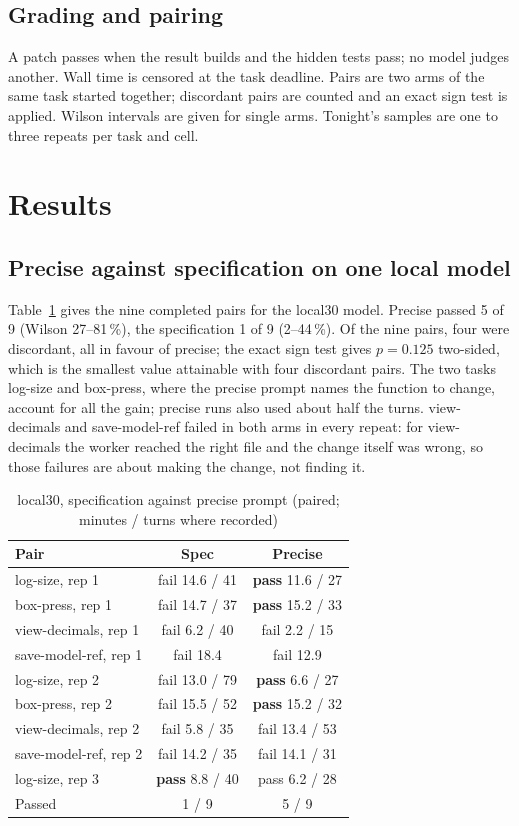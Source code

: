 \subsection{Grading and pairing}

A patch passes when the result builds and the hidden tests pass; no model judges another. Wall time is censored at the
task deadline. Pairs are two arms of the same task started together; discordant pairs are counted and an exact sign
test is applied. Wilson intervals \citep{Wilson-1927aa} are given for single arms. Tonight's samples are one to three
repeats per task and cell.

\section{Results}\label{sec:results}

\subsection{Precise against specification on one local model}\label{sec:e1}

Table~\ref{tab:e1} gives the nine completed pairs for the local30 model. Precise passed 5 of 9 (Wilson 27--81\,\%),
the specification 1 of 9 (2--44\,\%). Of the nine pairs, four were discordant, all in favour of precise; the exact sign
test gives $p=0.125$ two-sided, which is the smallest value attainable with four discordant pairs. The two tasks
log-size and box-press, where the precise prompt names the function to change, account for all the gain; precise runs also used about half the
turns. view-decimals and save-model-ref failed in both arms in every repeat: for view-decimals the worker reached the
right file and the change itself was wrong, so those failures are about making the change, not finding it.

\begin{table}[htbp]
\centering
\small
\caption{local30, specification against precise prompt (paired; minutes / turns where recorded)}\label{tab:e1}
\begin{tabular}{lcc}
\toprule
Pair & Spec & Precise \\
\midrule
log-size, rep 1 & fail 14.6 / 41 & \textbf{pass} 11.6 / 27 \\
box-press, rep 1 & fail 14.7 / 37 & \textbf{pass} 15.2 / 33 \\
view-decimals, rep 1 & fail 6.2 / 40 & fail 2.2 / 15 \\
save-model-ref, rep 1 & fail 18.4 & fail 12.9 \\
log-size, rep 2 & fail 13.0 / 79 & \textbf{pass} 6.6 / 27 \\
box-press, rep 2 & fail 15.5 / 52 & \textbf{pass} 15.2 / 32 \\
view-decimals, rep 2 & fail 5.8 / 35 & fail 13.4 / 53 \\
save-model-ref, rep 2 & fail 14.2 / 35 & fail 14.1 / 31 \\
log-size, rep 3 & \textbf{pass} 8.8 / 40 & pass 6.2 / 28 \\
\midrule
Passed & 1 / 9 & 5 / 9 \\
\bottomrule
\end{tabular}
\end{table}

